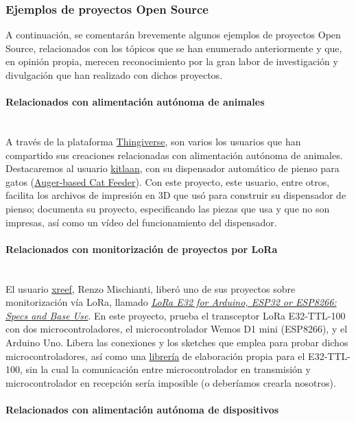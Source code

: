 \documentclass[12pt]{article}
\newcommand{\subsubsubsection}[1]{\paragraph{#1}\mbox{}\\}
\begin{document}
	\subsubsection{Ejemplos de proyectos Open Source}
	
	\noindent A continuación, se comentarán brevemente algunos ejemplos de proyectos Open Source, relacionados con los tópicos que se han enumerado anteriormente y que, en opinión propia, merecen reconocimiento por la gran labor de investigación y divulgación que han realizado con dichos proyectos. 
	
	\subsubsubsection{Relacionados con alimentación autónoma de animales}
	
	\noindent A través de la plataforma \href{https://www.thingiverse.com/}{Thingiverse}, son varios los usuarios que han compartido sus creaciones relacionadas con alimentación autónoma de animales. Destacaremos al usuario \href{https://www.thingiverse.com/kitlaan/designs}{kitlaan}, con su dispensador automático de pienso para gatos (\href{https://www.thingiverse.com/thing:27854}{Auger-based Cat Feeder}). Con este proyecto, este usuario, entre otros, facilita los archivos de impresión en 3D que usó para construir su dispensador de pienso; documenta su proyecto, especificando las piezas que usa y que no son impresas, así como un vídeo del funcionamiento del dispensador.
	
	\subsubsubsection{Relacionados con monitorización de proyectos por LoRa}
	
	\noindent El usuario \href{https://create.arduino.cc/projecthub/xreef}{xreef}, Renzo Mischianti, liberó uno de sus proyectos sobre monitorización vía LoRa, llamado \href{https://create.arduino.cc/projecthub/xreef/lora-e32-for-arduino-esp32-or-esp8266-specs-and-base-use-804d25}{\textit{LoRa E32 for Arduino, ESP32 or ESP8266: Specs and Base Use}}. En este proyecto, prueba el transceptor LoRa E32-TTL-100 con dos microcontroladores, el microcontrolador Wemos D1 mini (ESP8266), y el Arduino Uno. Libera las conexiones y los sketches que emplea para probar dichos microcontroladores, así como una \href{https://github.com/xreef/LoRa_E32_Series_Library}{librería} de elaboración propia para el E32-TTL-100, sin la cual la comunicación entre microcontrolador en transmisión y microcontrolador en recepción sería imposible (o deberíamos crearla nosotros).
	
	\subsubsubsection{Relacionados con alimentación autónoma de dispositivos}
	
\end{document}
